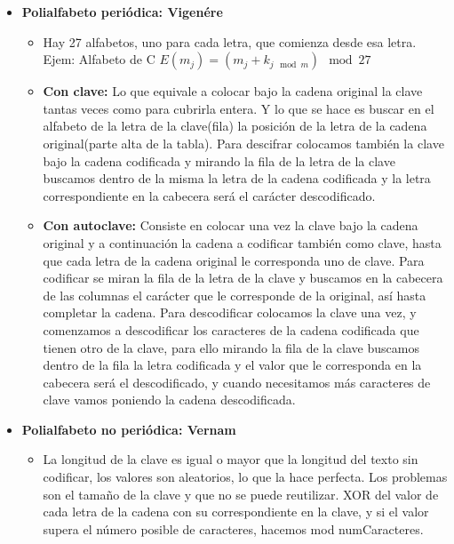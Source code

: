 \documentclass[12pt, twoside, openright]{report} %
\begin{document}
\begin{itemize}
\begin{itemize}
\begin{itemize}
      \end{itemize}
    \item \textbf{Polialfabeto periódica: Vigenére}
      

      \begin{itemize}
      \item Hay 27 alfabetos, uno para cada letra, que comienza desde esa
        letra. Ejem: Alfabeto de C $E(m_j) = (m_j+k_{j \mod m}) \mod 27$
        
      \item \textbf{Con clave:} Lo que equivale a colocar bajo la cadena
        original la clave tantas veces como para cubrirla entera. Y lo
        que se hace es buscar en el alfabeto de la letra de la
        clave(fila) la posición de la letra de la cadena original(parte
        alta de la tabla). Para descifrar colocamos también la clave
        bajo la cadena codificada y mirando la fila de la letra de la
        clave buscamos dentro de la misma la letra de la cadena
        codificada y la letra correspondiente en la cabecera será el
        carácter descodificado.
        
      \item \textbf{Con autoclave:} Consiste en colocar una vez la clave
        bajo la cadena original y a continuación la cadena a codificar
        también como clave, hasta que cada letra de la cadena original
        le corresponda uno de clave. Para codificar se miran la fila de
        la letra de la clave y buscamos en la cabecera de las columnas
        el carácter que le corresponde de la original, así hasta
        completar la cadena. Para descodificar colocamos la clave una
        vez, y comenzamos a descodificar los caracteres de la cadena
        codificada que tienen otro de la clave, para ello mirando la
        fila de la clave buscamos dentro de la fila la letra codificada
        y el valor que le corresponda en la cabecera será el
        descodificado, y cuando necesitamos más caracteres de clave
        vamos poniendo la cadena descodificada.
        
      \end{itemize}
    \item \textbf{Polialfabeto no periódica: Vernam}
      

      \begin{itemize}
      \item La longitud de la clave es igual o mayor que la longitud del
        texto sin codificar, los valores son aleatorios, lo que la hace
        perfecta. Los problemas son el tamaño de la clave y que no se
        puede reutilizar. XOR del valor de cada letra de la cadena con
        su correspondiente en la clave, y si el valor supera el número
        posible de caracteres, hacemos mod numCaracteres.
        

\end{itemize}
\end{itemize}
\end{itemize}
\end{document}
